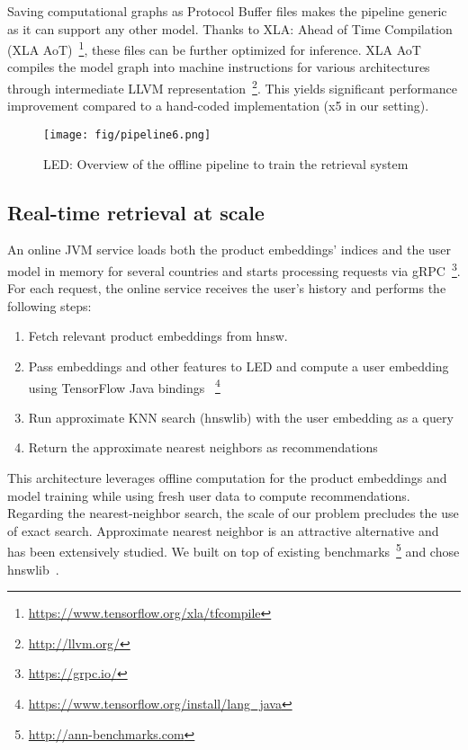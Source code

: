 \documentclass[sigconf]{acmart}
\begin{document}
Saving computational graphs as Protocol Buffer files makes the pipeline generic as it can support any other model. Thanks to XLA: Ahead of Time Compilation (XLA AoT)~\footnote{\url{https://www.tensorflow.org/xla/tfcompile}}, these files can be further optimized for inference. XLA AoT compiles the model graph into machine instructions for various architectures through intermediate LLVM representation~\footnote{\url{http://llvm.org/}}. This yields significant performance improvement compared to a hand-coded implementation (x5 in our setting). 
















\begin{figure}[h!]
\centering
\texttt{[image: fig/pipeline6.png]}
\caption{LED: Overview of the offline pipeline to train the retrieval system}
\label{fig:reference-system}
\end{figure}

\subsection{Real-time retrieval at scale}
\label{subsec:online-knn}

An online JVM service loads both the product embeddings' indices and the user model in memory for several countries and starts processing requests via gRPC~\footnote{\url{https://grpc.io/}}. For each request, the online service receives the user's history and performs the following steps:
  \begin{enumerate}
    \item Fetch relevant product embeddings from hnsw.
    \item Pass embeddings and other features to LED and compute a user embedding using TensorFlow Java bindings ~\footnote{\url{https://www.tensorflow.org/install/lang_java}}
    \item Run approximate KNN search (hnswlib) with the user embedding as a query
    \item Return the approximate nearest neighbors as recommendations
\end{enumerate}



This architecture leverages offline computation for the product embeddings and model training while using fresh user data to compute recommendations.  Regarding the nearest-neighbor search, the scale of our problem precludes the use of exact search. Approximate nearest neighbor is an attractive alternative and has been extensively studied. We built on top of existing benchmarks~\footnote{\url{http://ann-benchmarks.com}} and chose hnswlib~\cite{hnswlib-2018}. 
\end{document}
